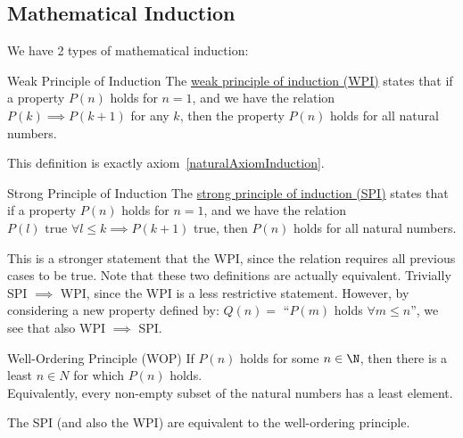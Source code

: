 \documentclass[../Main.tex]{subfiles}
\begin{document}
\subsection{Mathematical Induction}
We have 2 types of mathematical induction:
\begin{definition}{Weak Principle of Induction}
    The \underline{weak principle of induction (WPI)} states that if a property $P(n)$ holds for $n=1$, and we have the relation $P(k) \implies P(k+1)$ for any $k$, then the property $P(n)$ holds for all natural numbers.
\end{definition}
This definition is exactly axiom~\ref{naturalAxiomInduction}.
\begin{definition}{Strong Principle of Induction}
    The \underline{strong principle of induction (SPI)} states that if a property $P(n)$ holds for $n=1$, and we have the relation $P(l) \text{ true } \forall l \leq k \implies P(k+1)$ true, then $P(n)$ holds for all natural numbers.
\end{definition}
This is a stronger statement that the WPI, since the relation requires all previous cases to be true.
Note that these two definitions are actually equivalent. Trivially SPI $\implies$ WPI, since the WPI is a less restrictive statement. However, by considering a new property defined by: $Q(n) = $ ``$P(m)$ holds $\forall m \leq n$'', we see that also WPI $\implies$ SPI.
\begin{definition}{Well-Ordering Principle (WOP)}    
    If $P(n)$ holds for some $n \in \N$, then there is a least $n \in N$ for which $P(n)$ holds.\\
    Equivalently, every non-empty subset of the natural numbers has a least element.
\end{definition}
\begin{theorem}
    The SPI (and also the WPI) are equivalent to the well-ordering principle.
\end{theorem}
\end{document}
